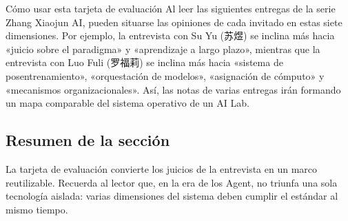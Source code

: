 \begin{knowledgebox}{Cómo usar esta tarjeta de evaluación}
Al leer las siguientes entregas de la serie Zhang Xiaojun AI, pueden situarse las opiniones de cada invitado en estas siete dimensiones. Por ejemplo, la entrevista con Su Yu (苏煜) se inclina más hacia «juicio sobre el paradigma» y «aprendizaje a largo plazo», mientras que la entrevista con Luo Fuli (罗福莉) se inclina más hacia «sistema de posentrenamiento», «orquestación de modelos», «asignación de cómputo» y «mecanismos organizacionales». Así, las notas de varias entregas irán formando un mapa comparable del sistema operativo de un AI Lab.
\end{knowledgebox}

\subsection{Resumen de la sección}

La tarjeta de evaluación convierte los juicios de la entrevista en un marco reutilizable. Recuerda al lector que, en la era de los Agent, no triunfa una sola tecnología aislada: varias dimensiones del sistema deben cumplir el estándar al mismo tiempo.
